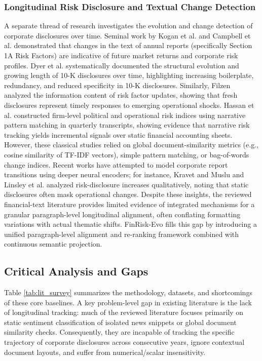 \documentclass[journal]{IEEEtran}
\begin{document}
\subsubsection{Longitudinal Risk Disclosure and Textual Change Detection}
A separate thread of research investigates the evolution and change detection of corporate disclosures over time. Seminal work by Kogan et al. \cite{kogan2009} and Campbell et al. \cite{campbell2014} demonstrated that changes in the text of annual reports (specifically Section 1A Risk Factors) are indicative of future market returns and corporate risk profiles. Dyer et al. \cite{dyer2017} systematically documented the structural evolution and growing length of 10-K disclosures over time, highlighting increasing boilerplate, redundancy, and reduced specificity in 10-K disclosures. Similarly, Filzen \cite{filzen2015} analyzed the information content of risk factor updates, showing that fresh disclosures represent timely responses to emerging operational shocks. Hassan et al. \cite{hassan2019} constructed firm-level political and operational risk indices using narrative pattern matching in quarterly transcripts, showing evidence that narrative risk tracking yields incremental signals over static financial accounting sheets. However, these classical studies relied on global document-similarity metrics (e.g., cosine similarity of TF-IDF vectors), simple pattern matching, or bag-of-words change indices. Recent works have attempted to model corporate report transitions using deeper neural encoders; for instance, Kravet and Muslu \cite{kravet2013} and Linsley et al. \cite{linsley2006} analyzed risk-disclosure increases qualitatively, noting that static disclosures often mask operational changes. Despite these insights, the reviewed financial-text literature provides limited evidence of integrated mechanisms for a granular paragraph-level longitudinal alignment, often conflating formatting variations with actual thematic shifts. FinRisk-Evo fills this gap by introducing a unified paragraph-level alignment and re-ranking framework combined with continuous semantic projection.

\subsection{Critical Analysis and Gaps}
Table \ref{tab:lit_survey} summarizes the methodology, datasets, and shortcomings of these core baselines. A key problem-level gap in existing literature is the lack of longitudinal tracking: much of the reviewed literature focuses primarily on static sentiment classification of isolated news snippets or global document similarity checks. Consequently, they are incapable of tracking the specific trajectory of corporate disclosures across consecutive years, ignore contextual document layouts, and suffer from numerical/scalar insensitivity.
\end{document}
